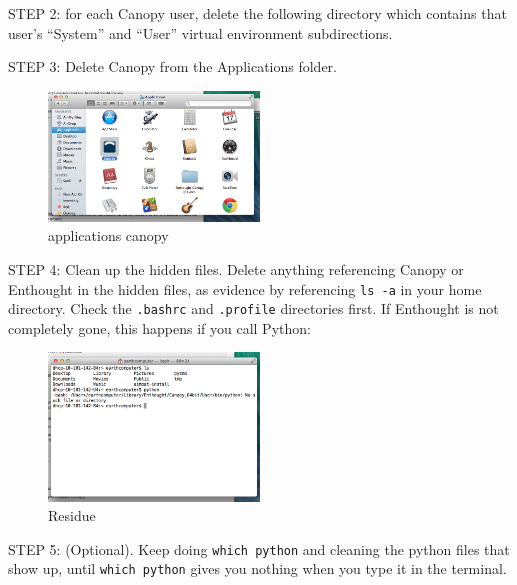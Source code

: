 \documentclass[letterpaper,10pt]{article}
\begin{document}
STEP 2: for each Canopy user, delete the following directory which contains that user's ``System'' and ``User'' virtual environment subdirections.

STEP 3: Delete Canopy from the Applications folder. 

\begin{figure}[h!]
  \centering
  \includegraphics[width=0.5\textwidth]{images/applications_canopy}
  \caption{applications canopy}
  \label{fig:applications_canopy}
\end{figure}

STEP 4: Clean up the hidden files. Delete anything referencing Canopy or Enthought in the hidden files, as evidence by referencing \verb"ls -a" in your home directory. Check the \verb".bashrc" and \verb".profile" directories first. If Enthought is not completely gone, this happens if you call Python:

\begin{figure}[h!]
  \centering
  \includegraphics[width=0.5\textwidth]{images/residue}
  \caption{Residue}
  \label{fig:residue}
\end{figure}

STEP 5: (Optional). Keep doing \texttt{which python} and cleaning the python files that show up, until \texttt{which python} gives you nothing when you type it in the terminal. 


\end{document}
